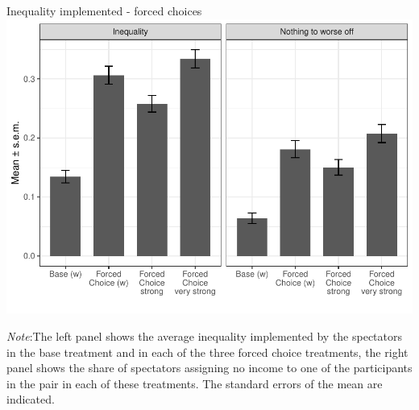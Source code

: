 \documentclass{beamer}
\begin{document}
\begin{frame}{Inequality implemented - forced choices}
	\includegraphics[height=.75\textheight]{../graphs/mean_ineq_nothing_robust_kantar.pdf}
	
	{\tiny 
		\emph{Note}:The left panel shows the average inequality implemented by the spectators in the base treatment and in each of the three forced choice treatments, the right panel shows the share of spectators assigning no income to one of the participants in the
		pair in each of these treatments. The standard errors of the mean are indicated.}
\end{frame}
\end{document}

